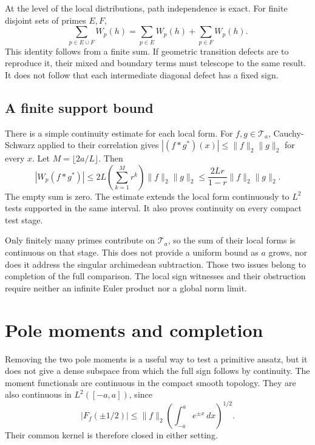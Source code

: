 \documentclass[11pt,letterpaper]{article}
\theoremstyle{definition}
\theoremstyle{remark}
\newcommand{\T}{\mathcal T}
\begin{document}
At the level of the local distributions, path independence
is exact. For finite disjoint sets of primes $E,F$,
\[
 \sum_{p\in E\cup F}W_p(h)=\sum_{p\in E}W_p(h)
 +\sum_{p\in F}W_p(h).
\]
This identity follows from a finite sum. If geometric
transition defects are to reproduce it, their mixed and
boundary terms must telescope to the same result. It does
not follow that each intermediate diagonal defect has a
fixed sign.

\subsection{A finite support bound}

There is a simple continuity estimate for each local form.
For $f,g\in\T_a$, Cauchy-Schwarz applied to their
correlation gives
$|(f*g^*)(x)|\leq\|f\|_2\|g\|_2$ for every $x$.
Let $M=\lfloor2a/L\rfloor$. Then
\begin{equation}
 |W_p(f*g^*)|
 \leq2L\left(\sum_{k=1}^{M}r^k\right)\|f\|_2\|g\|_2
 \leq\frac{2Lr}{1-r}\|f\|_2\|g\|_2.
 \label{eq:local-bound}
\end{equation}
The empty sum is zero. The estimate extends the local form
continuously to $L^2$ tests supported in the same interval.
It also proves continuity on every compact test stage.

Only finitely many primes contribute on $\T_a$, so the
sum of their local forms is continuous on that stage.
This does not provide a uniform bound as $a$ grows, nor
does it address the singular archimedean subtraction.
Those two issues belong to completion of the full comparison.
The local sign witnesses and their obstruction require
neither an infinite Euler product nor a global norm limit.

\section{Pole moments and completion}
\label{sec:completion}

Removing the two pole moments is a useful way to test a
primitive ansatz, but it does not give a dense subspace
from which the full sign follows by continuity. The moment
functionals are continuous in the compact smooth topology.
They are also continuous in $L^2([-a,a])$, since
\[
 |F_f(\pm1/2)|
 \leq\|f\|_2\left(\int_{-a}^ae^{\pm x}\,dx\right)^{1/2}.
\]
Their common kernel is therefore closed in either setting.
\end{document}
